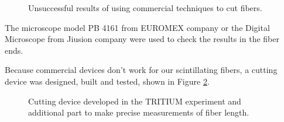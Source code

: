 \begin{figure}[htbp]
 \centering
 \caption{Unsuccessful results of using commercial techniques to cut fibers.}
 \label{fig:BadCutsOfFibers}
\end{figure}

The microscope model PB 4161 from EUROMEX company or the Digital Microscope from Jiusion company were used to check the results in the fiber ends.


Because commercial devices don't work for our scintillating fibers, a cutting device was designed, built and tested, shown in Figure \ref{fig:CuttingTRITIUMDevice}.

\begin{figure}[htbp]
 \centering
    \newline
 \caption{Cutting device developed in the TRITIUM experiment and additional part to make precise measurements of fiber length.}
 \label{fig:CuttingTRITIUMDevice}
\end{figure}


